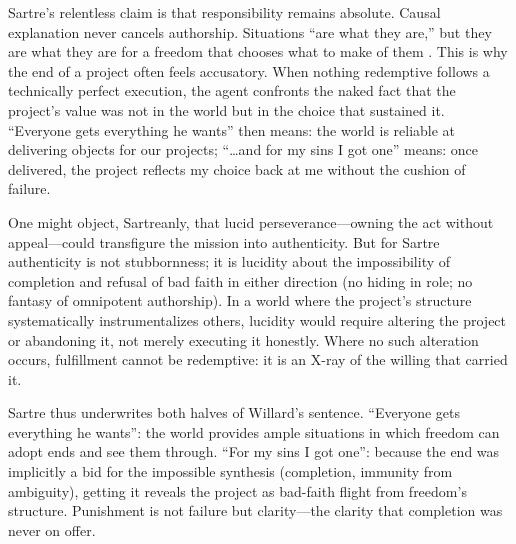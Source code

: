 Sartre's relentless claim is that responsibility remains absolute. Causal explanation never
cancels authorship. Situations ``are what they are,'' but they are what they are for a freedom
that chooses what to make of them \parencite[pp.~553--561]{SartreBN2003}. This is why the end
of a project often feels accusatory. When nothing redemptive follows a technically perfect
execution, the agent confronts the naked fact that the project's value was not in the world but
in the choice that sustained it. ``Everyone gets everything he wants'' then means: the world is
reliable at delivering objects for our projects; ``\ldots and for my sins I got one'' means:
once delivered, the project reflects my choice back at me without the cushion of failure.

One might object, Sartreanly, that lucid perseverance—owning the act without appeal—could
transfigure the mission into authenticity. But for Sartre authenticity is not stubbornness; it
is lucidity about the impossibility of completion and refusal of bad faith in either direction
(no hiding in role; no fantasy of omnipotent authorship). In a world where the project's
structure systematically instrumentalizes others, lucidity would require altering the project or
abandoning it, not merely executing it honestly. Where no such alteration occurs, fulfillment
cannot be redemptive: it is an X-ray of the willing that carried it.

Sartre thus underwrites both halves of Willard's sentence. ``Everyone gets everything he
wants'': the world provides ample situations in which freedom can adopt ends and see them
through. ``For my sins I got one'': because the end was implicitly a bid for the impossible
synthesis (completion, immunity from ambiguity), getting it reveals the project as bad-faith
flight from freedom's structure. Punishment is not failure but clarity—the clarity that
completion was never on offer.
